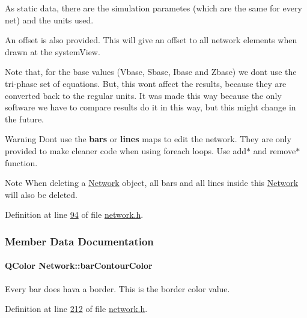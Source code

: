 As static data, there are the simulation parametes (which are the same for every net) and the units used.

An offset is also provided. This will give an offset to all network elements when drawn at the system\+View.

Note that, for the base values (Vbase, Sbase, Ibase and Zbase) we don\textquotesingle{}t use the tri-\/phase set of equations. But, this wont affect the results, because they are converted back to the regular units. It was made this way because the only software we have to compare results do it in this way, but this might change in the future.

\begin{DoxyWarning}{Warning}
Don\textquotesingle{}t use the {\bfseries bars} or {\bfseries lines} maps to edit the network. They are only provided to make cleaner code when using foreach loops. Use add$\ast$ and remove$\ast$ function.
\end{DoxyWarning}
\begin{DoxyNote}{Note}
When deleting a \hyperlink{class_network}{Network} object, all bars and all lines inside this \hyperlink{class_network}{Network} will also be deleted. 
\end{DoxyNote}


Definition at line \hyperlink{network_8h_source_l00094}{94} of file \hyperlink{network_8h_source}{network.\+h}.



\subsubsection{Member Data Documentation}
\hypertarget{class_network_a20c58a0630bdbbade527d55ba48d924c}{}
\paragraph[{bar\+Contour\+Color}]{\setlength{\rightskip}{0pt plus 5cm}Q\+Color Network\+::bar\+Contour\+Color}\label{class_network_a20c58a0630bdbbade527d55ba48d924c}
Every bar does hava a border. This is the border color value. 

Definition at line \hyperlink{network_8h_source_l00212}{212} of file \hyperlink{network_8h_source}{network.\+h}.

\hypertarget{class_network_ae37a8418e42adf765b143cdc9d992b6c}{}

